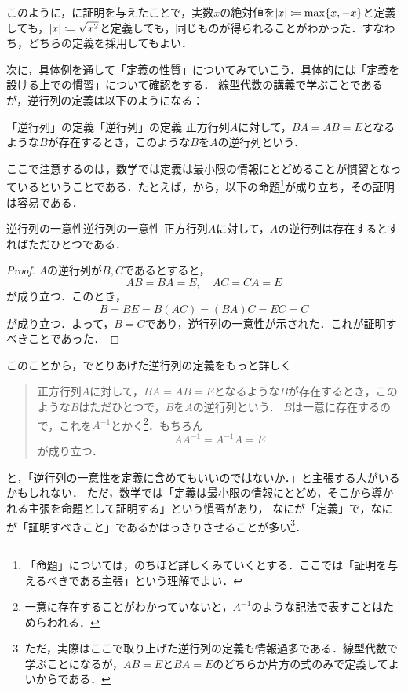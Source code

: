 このように，に証明を与えたことで，実数$x$の絶対値を$\lvert x\rvert \coloneqq \max \{x,-x\}$と定義しても，$\lvert x\rvert \coloneqq \sqrt{x^2}$と定義しても，同じものが得られることがわかった．すなわち，どちらの定義を採用してもよい．


次に，具体例を通して「定義の性質」についてみていこう．具体的には「定義を設ける上での慣習」について確認をする．
線型代数の講義で学ぶことであるが，逆行列の定義は以下のようになる：

\begin{example}{「逆行列」の定義}{「逆行列」の定義}
  正方行列$A$に対して，$BA = AB =E$となるような$B$が存在するとき，このような$B$を$A$の逆行列という．
\end{example}


ここで注意するのは，数学では定義は最小限の情報にとどめることが慣習となっているということである．たとえば，から，以下の命題\footnote{「命題」については，のちほど詳しくみていくとする．ここでは「証明を与えるべきである主張」という理解でよい．}が成り立ち，その証明は容易である．

\begin{prop}{逆行列の一意性}{逆行列の一意性}
  正方行列$A$に対して，$A$の逆行列は存在するとすればただひとつである．
\end{prop}

\begin{tleftbar}
  \begin{proof}
    $A$の逆行列が$B,C$であるとすると，
    \[
      AB=BA=E,\quad AC=CA=E
    \]
    が成り立つ．このとき，
    \[
      B=BE=B(AC)=(BA)C=EC=C
    \]
    が成り立つ．よって，$B=C$であり，逆行列の一意性が示された．これが証明すべきことであった．
  \end{proof}
\end{tleftbar}

このことから，でとりあげた逆行列の定義をもっと詳しく

\begin{quote}
  正方行列$A$に対して，$BA = AB =E$となるような$B$が存在するとき，このような$B$はただひとつで，$B$を$A$の逆行列という．
  $B$は一意に存在するので，これを$A^{-1}$とかく\footnote{一意に存在することがわかっていないと，$A^{-1}$のような記法で表すことはためらわれる．}．もちろん
  \[
    AA^{-1}=A^{-1}A=E
  \]
  が成り立つ．
\end{quote}
と，「逆行列の一意性を定義に含めてもいいのではないか．」と主張する人がいるかもしれない．
ただ，数学では「定義は最小限の情報にとどめ，そこから導かれる主張を命題として証明する」という慣習があり，
なにが「定義」で，なにが「証明すべきこと」であるかはっきりさせることが多い\footnote{ただ，実際はここで取り上げた逆行列の定義も情報過多である．線型代数で学ぶことになるが，$AB=E$と$BA=E$のどちらか片方の式のみで定義してよいからである．}．

